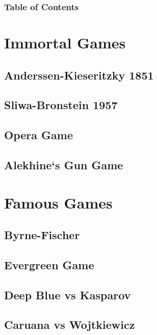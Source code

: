 \documentclass{beamer}
\begin{document}
\begin{frame}[t]
    \frametitle{Table of Contents}
    \tableofcontents
\end{frame}

\section{Immortal Games}
\subsection{Anderssen-Kieseritzky 1851}
\subsection{Sliwa-Bronstein 1957}
\subsection{Opera Game}
\subsection{Alekhine`s Gun Game}
\section{Famous Games}
\subsection{Byrne-Fischer}
\subsection{Evergreen Game}
\subsection{Deep Blue vs Kasparov}
\subsection{Caruana vs Wojtkiewicz}
\end{document}
